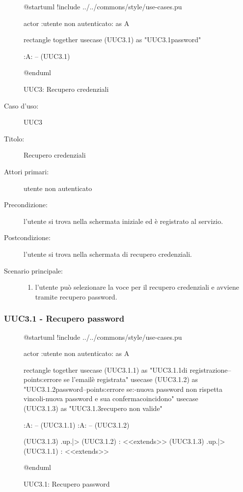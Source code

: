 \documentclass[../../../analisi-dei-requisiti.tex]{subfiles}
\begin{document}
\begin{figure}[h!]
  \centering
  \begin{plantuml}
  @startuml
  !include ../../commons/style/use-cases.pu

  actor :utente non autenticato: as A

  rectangle {
    together {
      usecase (UUC3.1) as "UUC3.1\nRecupero password"
    }
  }

  :A: -- (UUC3.1)

  @enduml
  \end{plantuml}
  \caption{UUC3: Recupero credenziali}
  \label{fig:uuc3}
\end{figure}

\begin{description}
  \item[Caso d’uso:] UUC3
  \item[Titolo:] Recupero credenziali
  \item[Attori primari:] utente non autenticato
  \item[Precondizione:] l'utente si trova nella schermata iniziale ed è registrato al servizio.
  \item[Postcondizione:] l'utente si trova nella schermata di recupero credenziali.
  \item[Scenario principale:]
        \begin{enumerate}
          \item l'utente può selezionare la voce per il recupero credenziali e avviene tramite recupero password.
        \end{enumerate}
\end{description}

\subsubsection{UUC3.1 - Recupero password}%
\label{subs:UUC3.1}

\begin{figure}[h!]
  \centering
  \begin{plantuml}
  @startuml
  !include ../../commons/style/use-cases.pu

  actor :utente non autenticato: as A

  rectangle {
    together {
      usecase (UUC3.1.1) as "UUC3.1.1\nInserimento\nemail di registrazione\n--\nExtension points:\nVisualizzazione errore se l'email\nnon è registrata"
      usecase (UUC3.1.2) as "UUC3.1.2\nReimpostazione password\n--\nExtension points:\nVisualizzazione errore se:\n-nuova password non rispetta vincoli\n-nuova password e sua conferma\nnon coincidono"
      usecase (UUC3.1.3) as "UUC3.1.3\nInformazioni recupero non valide"
    }
  }

  :A: -- (UUC3.1.1)
  :A: -- (UUC3.1.2)

  (UUC3.1.3) .up.|> (UUC3.1.2) : <<extends>>
  (UUC3.1.3) .up.|> (UUC3.1.1) : <<extends>>

  @enduml
  \end{plantuml}
  \caption{UUC3.1: Recupero password}
  \label{fig:uuc3_1}
\end{figure}
\end{document}
